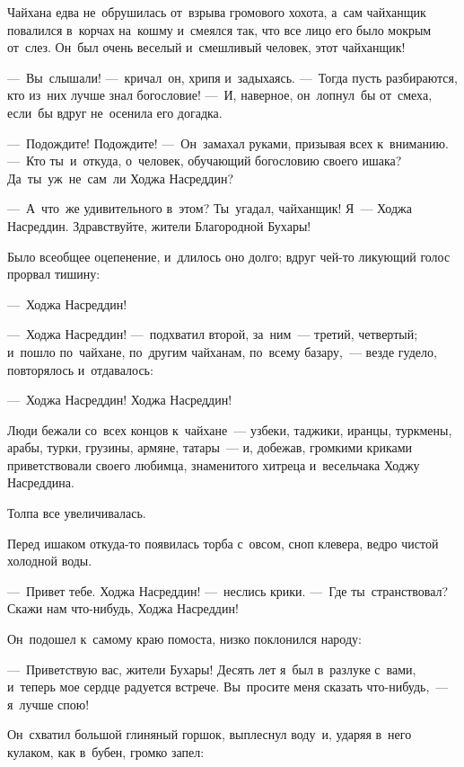\documentclass[12pt,a4paper]{book}
\begin{document}
Чайхана едва не~обрушилась от~взрыва громового хохота, а~сам чайханщик повалился в~корчах на~кошму и~смеялся так, что все лицо его было мокрым от~слез. Он~был очень веселый и~смешливый человек, этот чайханщик!

—~Вы~слышали! —~кричал~он, хрипя и~задыхаясь. —~Тогда пусть разбираются, кто из~них лучше знал богословие! —~И, наверное, он~лопнул~бы от~смеха, если~бы вдруг не~осенила его догадка.

—~Подождите! Подождите! —~Он~замахал руками, призывая всех к~вниманию. —~Кто ты~и~откуда, о~человек, обучающий богословию своего ишака? Да~ты~уж~не~сам~ли Ходжа Насреддин?

—~А~что~же удивительного в~этом? Ты~угадал, чайханщик! Я~— Ходжа Насреддин. Здравствуйте, жители Благородной Бухары!

Было всеобщее оцепенение, и~длилось оно долго; вдруг чей-то ликующий голос прорвал тишину:

—~Ходжа Насреддин!

—~Ходжа Насреддин! —~подхватил второй, за~ним~— третий, четвертый; и~пошло по~чайхане, по~другим чайханам, по~всему базару,~— везде гудело, повторялось и~отдавалось:

—~Ходжа Насреддин! Ходжа Насреддин!

Люди бежали со~всех концов к~чайхане~— узбеки, таджики, иранцы, туркмены, арабы, турки, грузины, армяне, татары~— и, добежав, громкими криками приветствовали своего любимца, знаменитого хитреца и~весельчака Ходжу Насреддина.

Толпа все увеличивалась.

Перед ишаком откуда-то появилась торба с~овсом, сноп клевера, ведро чистой холодной воды.

—~Привет тебе. Ходжа Насреддин! —~неслись крики. —~Где ты~странствовал? Скажи нам что-нибудь, Ходжа Насреддин!

Он~подошел к~самому краю помоста, низко поклонился народу:

—~Приветствую вас, жители Бухары! Десять лет я~был в~разлуке с~вами, и~теперь мое сердце радуется встрече. Вы~просите меня сказать что-нибудь,~— я~лучше спою!

Он~схватил большой глиняный горшок, выплеснул воду~и, ударяя в~него кулаком, как в~бубен, громко запел:
\end{document}
